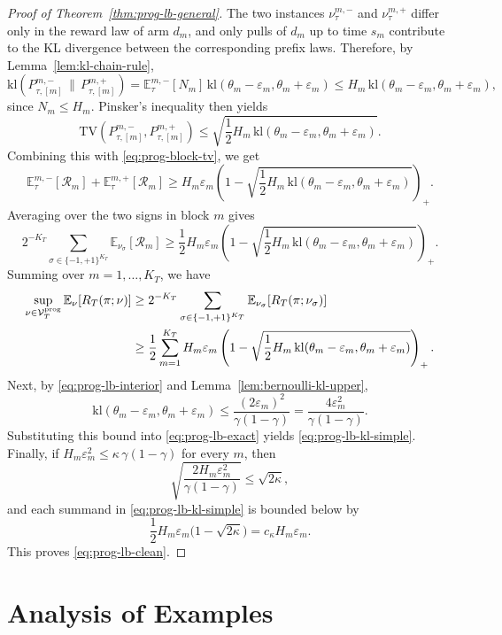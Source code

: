 \documentclass[11pt]{article}
\begin{document}
\begin{proof}[Proof of Theorem~\ref{thm:prog-lb-general}]
The two instances $\nu_{\tau}^{m,-}$ and $\nu_{\tau}^{m,+}$ differ only in the
reward law of arm $d_m$, and only pulls of $d_m$ up to time $s_m$ contribute to
the KL divergence between the corresponding prefix laws. Therefore, by
Lemma~\ref{lem:kl-chain-rule},
\[
\mathrm{kl}(P_{\tau,[m]}^{m,-}\,\|\,P_{\tau,[m]}^{m,+})
=
\mathbb E_{\tau}^{m,-}[N_m]\,
\mathrm{kl}(\theta_m-\varepsilon_m,\theta_m+\varepsilon_m)
\le
H_m\,\mathrm{kl}(\theta_m-\varepsilon_m,\theta_m+\varepsilon_m),
\]
since $N_m\le H_m$.
Pinsker's inequality then yields
\[
\mathrm{TV}(P_{\tau,[m]}^{m,-},P_{\tau,[m]}^{m,+})
\le
\sqrt{
\frac12 H_m\,\mathrm{kl}(\theta_m-\varepsilon_m,\theta_m+\varepsilon_m)
}.
\]
Combining this with \eqref{eq:prog-block-tv}, we get
\[
\mathbb E_{\tau}^{m,-}[\mathcal R_m]
+
\mathbb E_{\tau}^{m,+}[\mathcal R_m]
\ge
H_m\varepsilon_m
\left(
1-
\sqrt{
\frac12 H_m\,\mathrm{kl}(\theta_m-\varepsilon_m,\theta_m+\varepsilon_m)
}
\right)_+ .
\]
Averaging over the two signs in block $m$ gives
\[
2^{-K_T}
\sum_{\sigma\in\{-1,+1\}^{K_T}}
\mathbb E_{\nu_\sigma}[\mathcal R_m]
\ge
\frac12
H_m\varepsilon_m
\left(
1-
\sqrt{
\frac12 H_m\,\mathrm{kl}(\theta_m-\varepsilon_m,\theta_m+\varepsilon_m)
}
\right)_+ .
\]
Summing over $m=1,\dots,K_T$, we have 
\begin{align}
\sup_{\nu\in\mathcal V_T^{\mathrm{prog}}}
\mathbb E_\nu[R_T(\pi;\nu)]
&\ge
2^{-K_T}
\sum_{\sigma\in\{-1,+1\}^{K_T}}
\mathbb E_{\nu_\sigma}[R_T(\pi;\nu_\sigma)]
\notag\\
&\ge
\frac12
\sum_{m=1}^{K_T}
H_m\varepsilon_m
\left(
1-
\sqrt{
\frac12 H_m\,
\mathrm{kl}(\theta_m-\varepsilon_m,\theta_m+\varepsilon_m)
}
\right)_+ .
\label{eq:prog-lb-exact}
\end{align}
 Next, by \eqref{eq:prog-lb-interior} and Lemma~\ref{lem:bernoulli-kl-upper},
\[
\mathrm{kl}(\theta_m-\varepsilon_m,\theta_m+\varepsilon_m)
\le
\frac{(2\varepsilon_m)^2}{\gamma(1-\gamma)}
=
\frac{4\varepsilon_m^2}{\gamma(1-\gamma)}.
\]
Substituting this bound into \eqref{eq:prog-lb-exact} yields
\eqref{eq:prog-lb-kl-simple}. Finally, if
\(
H_m\varepsilon_m^2\le \kappa\,\gamma(1-\gamma)
\)
for every $m$, then
\[
\sqrt{
\frac{2H_m\varepsilon_m^2}{\gamma(1-\gamma)}
}
\le
\sqrt{2\kappa},
\]
and each summand in \eqref{eq:prog-lb-kl-simple} is bounded below by
\[
\frac12 H_m\varepsilon_m\bigl(1-\sqrt{2\kappa}\bigr)
=
c_\kappa H_m\varepsilon_m.
\]
This proves \eqref{eq:prog-lb-clean}.
\end{proof}

\section{Analysis of Examples}
\end{document}
